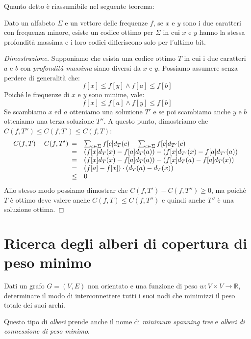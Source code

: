 Quanto detto è riassumibile nel seguente teorema:
\begin{definition}
    Dato un alfabeto $\Sigma$ e un vettore delle frequenze $f$, se $x$ e $y$
    sono i due caratteri con frequenza minore, esiste un codice ottimo per
    $\Sigma$ in cui $x$ e $y$ hanno la stessa profondità massima e i loro codici
    differiscono solo per l'ultimo bit.
\end{definition}
\begin{proof}[Dimostrazione]
    Supponiamo che esista una codice ottimo $T$ in cui i due caratteri $a$ e $b$
    con \emph{profondità massima} siano diversi da $x$ e $y$. Possiamo assumere
    senza perdere di generalità che:
    \[f[x]\leq f[y]\wedge f[a]\leq f[b]\]
    Poiché le frequenze di $x$ e $y$ sono minime, vale:
    \[f[x]\leq f[a]\wedge f[y]\leq f[b]\]
    Se scambiamo $x$ ed $a$ otteniamo una soluzione $T'$ e se poi scambiamo
    anche $y$ e $b$ otteniamo una terza soluzione $T''$. A questo punto,
    dimostriamo che $C(f,T'')\leq C(f,T')\leq C(f,T)$:
    \[C(f,T)-C(f,T')\begin{array}[t]{cl}
        = & \sum_{c\in\Sigma} f[c]d_T(c)-\sum_{c\in\Sigma}f[c]d_{T'}(c)\\
        = & \left(f[x]d_T(x)-f[a]d_{T}(a)\right)-\left(f[x]d_{T'}(x)-
        f[a]d_{T'}(a)\right)\\
        = & \left(f[x]d_T(x)-f[a]d_{T}(a)\right)-\left(f[x]d_{T}(a)-
        f[a]d_{T}(x)\right)\\
        = & \left(f[a]-f[x]\right)\cdot\left(d_T(a)-d_T(x)\right)\\
        \leq & 0
    \end{array}\]
    Allo stesso modo possiamo dimostrar che $C(f,T')-C(f,T'')\geq 0$, ma
    poiché $T$ è ottimo deve valere anche $C(f,T)\leq C(f,T'')$ e quindi anche
    $T''$ è una soluzione ottima.
\end{proof}

\section{Ricerca degli alberi di copertura di peso minimo}
\begin{problem}
    Dati un grafo $G=(V,E)$ non orientato e una funzione di peso $w:V\times
    V\to\mathbb{R}$, determinare il modo di interconnettere tutti i suoi
    nodi che minimizzi il peso totale dei suoi archi.
\end{problem}
\begin{note}
    Questo tipo di \emph{alberi} prende anche il nome di \emph{minimum spanning
    tree} e \emph{alberi di connessione di peso minimo}.
\end{note}

